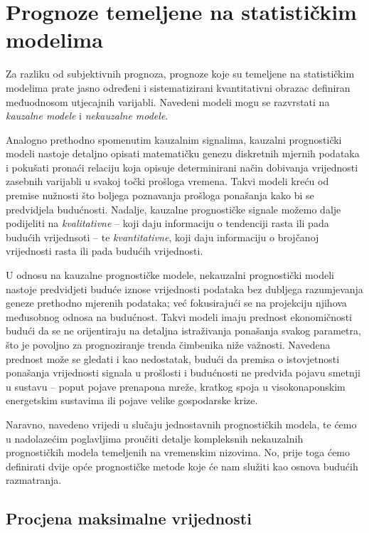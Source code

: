 \documentclass[a4paper,12pt,oneside]{memoir}
\begin{document}
        \section{Prognoze temeljene na statističkim modelima}
            Za razliku od subjektivnih prognoza, prognoze koje su temeljene na statističkim modelima prate jasno određeni i sistematizirani kvantitativni obrazac definiran međuodnosom utjecajnih varijabli. Navedeni modeli mogu se razvrstati na \textit{kauzalne modele} i \textit{nekauzalne modele}.\cite{Holden}
            
            Analogno prethodno spomenutim kauzalnim signalima, kauzalni prognostički modeli nastoje detaljno opisati matematičku genezu diskretnih mjernih podataka i pokušati pronaći relaciju koja opisuje determinirani način dobivanja vrijednosti zasebnih varijabli u svakoj točki prošloga vremena. Takvi modeli kreću od premise nužnosti što boljega poznavanja prošloga ponašanja kako bi se predvidjela budućnosti. Nadalje, kauzalne prognostičke signale možemo dalje podijeliti na \textit{kvalitativne} -- koji daju informaciju o tendenciji rasta ili pada budućih vrijednsoti -- te \textit{kvantitativne}, koji daju informaciju o brojčanoj vrijednosti rasta ili pada budućih vrijednosti.
            
            
            U odnosu na kauzalne prognostičke modele, nekauzalni prognostički modeli nastoje predvidjeti buduće iznose vrijednosti podataka bez dubljega razumjevanja geneze prethodno mjerenih podataka; već fokusirajući se na projekciju njihova međusobnog odnosa na budućnost. Takvi modeli imaju prednost ekonomičnosti budući da se ne orijentiraju na detaljna istraživanja ponašanja svakog parametra, što je povoljno za prognoziranje trenda čimbenika niže važnosti. Navedena prednost može se gledati i kao nedostatak, budući da premisa o istovjetnosti ponašanja vrijednosti signala u prošlosti i budućnosti ne predviđa pojavu smetnji u sustavu -- poput pojave prenapona mreže, kratkog spoja u visokonaponskim energetskim sustavima ili pojave velike gospodarske krize. 
            
            
            Naravno, navedeno vrijedi u slučaju jednostavnih prognostičkih modela, te ćemo u nadolazećim poglavljima proučiti detalje kompleksnih nekauzalnih prognostičkih modela temeljenih na vremenskim nizovima. No, prije toga ćemo definirati dvije opće prognostičke metode koje će nam služiti kao osnova budućih razmatranja.

            \subsection{Procjena maksimalne vrijednosti}
            \label{subs:ML}
\end{document}
